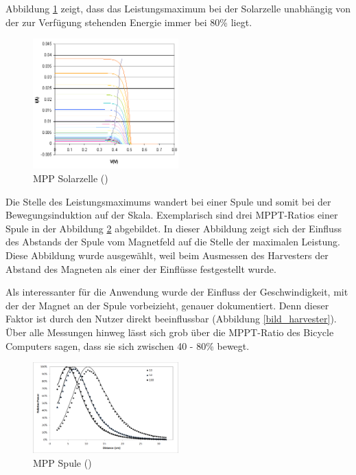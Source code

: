 Abbildung \ref{mppsolar} zeigt, dass das Leistungsmaximum bei der Solarzelle unabhängig von der zur Verfügung stehenden Energie immer bei 80\thinspace\% liegt.

\begin{figure}[ht]
    \includegraphics[width=0.5\textwidth]{2TheoretischeGrundlagen/imag/MPPSolar.png} 
    \caption{MPP Solarzelle (\cite{mpp_solar})}
    \label{mppsolar}
\end{figure}

Die Stelle des Leistungsmaximums wandert bei einer Spule und somit bei der Bewegungsinduktion auf der Skala. Exemplarisch sind drei MPPT-Ratios einer Spule in der Abbildung \ref{bildspule} abgebildet. In dieser Abbildung zeigt sich der Einfluss des Abstands der Spule vom Magnetfeld auf die Stelle der maximalen Leistung. Diese Abbildung wurde ausgewählt, weil beim Ausmessen des Harvesters der Abstand des Magneten als einer der Einflüsse festgestellt wurde.

Als interessanter für die Anwendung wurde der Einfluss der Geschwindigkeit, mit der der Magnet an der Spule vorbeizieht, genauer dokumentiert. Denn dieser Faktor ist durch den Nutzer direkt beeinflussbar (Abbildung \ref{bild_harvester}). Über alle Messungen hinweg lässt sich grob über die MPPT-Ratio des Bicycle Computers sagen, dass sie sich zwischen 40 - 80\thinspace\% bewegt.

\begin{figure}[ht]
   \includegraphics[width=0.5\textwidth]{2TheoretischeGrundlagen/imag/MPPSpule.png}
   \caption{MPP Spule (\cite{MPP_Spule})}
   \label{bildspule} 
\end{figure}

